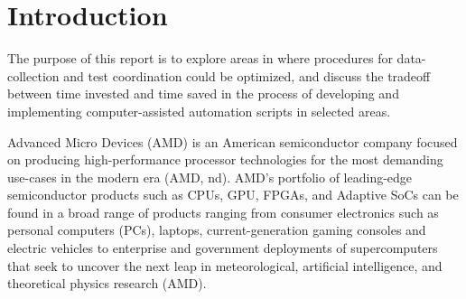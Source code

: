 \documentclass[12pt]{article}
\begin{document}





\formattingForRestOfReport
\section{Introduction}






The purpose of this report is to explore areas in where procedures for data-collection and test coordination could be optimized, and discuss the tradeoff between time invested and time saved in the process of developing and implementing computer-assisted automation scripts in selected areas.  

Advanced Micro Devices (AMD) is an American semiconductor company focused on producing high-performance processor technologies for the most demanding use-cases in the modern era (AMD, nd). AMD’s portfolio of leading-edge semiconductor products such as CPUs, GPU, FPGAs, and Adaptive SoCs can be found in a broad range of products ranging from consumer electronics such as personal computers (PCs), laptops, current-generation gaming consoles and electric vehicles to enterprise and government deployments of supercomputers that seek to uncover the next leap in meteorological, artificial intelligence, and theoretical physics research (AMD). 
\end{document}
